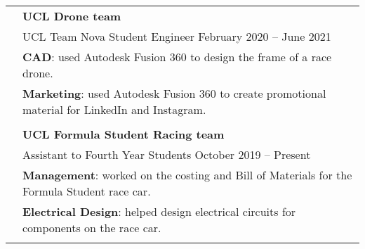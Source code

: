 \documentclass[letterpaper, 11pt]{article}
\begin{document}
\begin{longtable}{p{1.3in}p{4.8in}}
     & \textbf{UCL Drone team}                                                                                                                                                                                            \\
     & UCL Team Nova Student Engineer \hfill February 2020 -- June 2021                                                                                                                                                   \\
     & \textbf{CAD}: used Autodesk Fusion 360 to design the frame of a race drone.                                                                                                                                        \\
     & \textbf{Marketing}: used Autodesk Fusion 360 to create promotional material for LinkedIn and Instagram.                                                                                                            \\
     &                                                                                                                                                                                                                    \\

     & \textbf{UCL Formula Student Racing team}                                                                                                                                                                           \\
     & Assistant to Fourth Year Students \hfill October 2019 -- Present                                                                                                                                                   \\
     & \textbf{Management}: worked on the costing and Bill of Materials for the Formula Student race car.                                                                                                                 \\
     & \textbf{Electrical Design}: helped design electrical circuits for components on the race car.                                                                                                                      \\
     &                                                                                                                                                                                                                    \\


\end{longtable}
\end{document}
